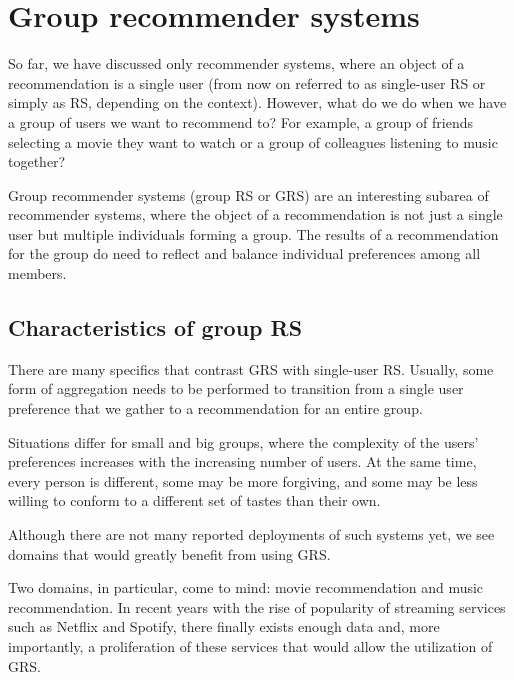 
\section{Group recommender systems} \label{sec:01_group_rec_sys}

So far, we have discussed only recommender systems, where an object of a recommendation is a single user (from now on referred to as single-user RS or simply as RS, depending on the context). However, what do we do when we have a group of users we want to recommend to? For example, a group of friends selecting a movie they want to watch or a group of colleagues listening to music together?  %

Group recommender systems (group RS or GRS) are an interesting subarea of recommender systems, where the object of a recommendation is not just a single user but multiple individuals forming a group. The results of a recommendation for the group do need to reflect and balance individual preferences among all members.


\subsection{Characteristics of group RS}

There are many specifics that contrast GRS with single-user RS. Usually, some form of aggregation needs to be performed to transition from a single user preference that we gather to a recommendation for an entire group.

Situations differ for small and big groups, where the complexity of the users' preferences increases with the increasing number of users. At the same time, every person is different, some may be more forgiving, and some may be less willing to conform to a different set of tastes than their own.

Although there are not many reported deployments of such systems yet, we see domains that would greatly benefit from using GRS.

Two domains, in particular, come to mind: movie recommendation and music recommendation. In recent years with the rise of popularity of streaming services such as Netflix and Spotify, there finally exists enough data and, more importantly, a proliferation of these services that would allow the utilization of GRS.

